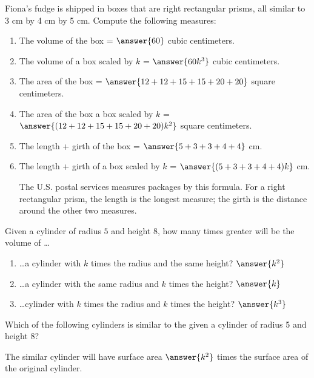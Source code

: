 \documentclass[nooutcomes]{ximera}
\begin{document}
\begin{question}
Fiona's fudge is shipped in boxes that are right rectangular prisms, all similar to 3 cm by 4 cm by 5 cm.  Compute the following measures: 
\begin{enumerate}
\item The volume of the box = $\answer{60}$ cubic centimeters.
\item The volume of a box scaled by $k$ = $\answer{60k^3}$ cubic centimeters.
\item The area of the box = $\answer{12+12+15+15+20+20}$ square centimeters. 
\item The area of the box a box scaled by $k$ = $\answer{(12+12+15+15+20+20)k^2}$ square centimeters. 
\item The length + girth of the box = $\answer{5 + 3 + 3 + 4 + 4}$ cm.
\item The length + girth of a box scaled by $k$ = $\answer{(5 + 3 + 3 + 4 + 4)k}$ cm. 
\begin{hint}The U.S. postal services measures packages by this formula.  For a right rectangular prism, the length is the longest measure; the girth is the distance around the other two measures.  \end{hint}
\end{enumerate}
\end{question}

\begin{question}
Given a cylinder of radius $5$ and height $8$, how many times greater will be the volume of \dots
\begin{enumerate}
\item \dots a cylinder with $k$ times the radius and the same height?  $\answer{k^2}$
\item \dots a cylinder with the same radius and $k$ times the height?  $\answer{k}$
\item \dots cylinder with $k$ times the radius and $k$ times the height?  $\answer{k^3}$
\end{enumerate}
\end{question}

\begin{question}
Which of the following cylinders is similar to the given a cylinder of radius 5 and height 8?  
\begin{selectAll}
\end{selectAll}

The similar cylinder will have surface area $\answer{k^2}$ times the surface area of the original cylinder.  
\end{question}
\end{document}
